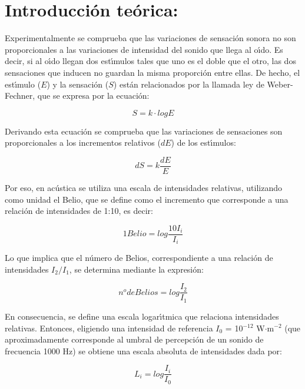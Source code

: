 \documentclass[a4paper,12pt]{article}
\begin{document}
\vspace{1.5cm}

\section*{Introducci\'on te\'orica:}
Experimentalmente se comprueba que las variaciones de sensaci\'on sonora no son 
proporcionales a las variaciones de intensidad del sonido que llega al o\'{\i}do. 
Es decir, si al o\'{\i}do llegan dos est\'{\i}mulos tales que uno es el doble que el otro, 
las dos sensaciones que inducen no guardan la misma proporci\'on entre ellas. De hecho, 
el est\'{\i}mulo ($E$) y la sensaci\'on ($S$) est\'an relacionados por la llamada ley de 
Weber-Fechner, que se expresa por la ecuaci\'on:

\begin{equation}
S=k \cdot log E
\end{equation}

Derivando esta ecuaci\'on se comprueba que las variaciones de sensaciones son 
proporcionales a los incrementos relativos ($dE$) de los est\'{\i}mulos:

\begin{equation}
dS=k \frac{dE}{E}
\end{equation}

Por eso, en ac\'ustica se utiliza una escala de intensidades relativas, utilizando como 
unidad el Belio, que se define como el incremento que corresponde a una relaci\'on de 
intensidades de 1:10, es decir:

\begin{equation}
1 Belio = log\frac{10 I_i}{I_i}
\end{equation}

Lo que implica que el n\'umero de Belios, correspondiente a una relaci\'on de 
intensidades $I_2/I_1$, se determina mediante la expresi\'on:

\begin{equation}
n^o de Belios = log\frac{I_2}{I_1}
\end{equation}

En consecuencia, se define una escala logar\'{\i}tmica que relaciona intensidades relativas. 
Entonces, eligiendo una intensidad de referencia $I_0$ = 10$^{-12}$ W$\cdot$m$^{-2}$ 
(que aproximadamente corresponde al umbral de percepci\'on de un sonido de frecuencia 
1000 Hz) se obtiene una escala absoluta de intensidades dada por:

\begin{equation}
L_i = log\frac{I_i}{I_0}
\end{equation}
\end{document}
